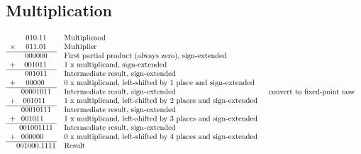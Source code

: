 \documentclass[12pt,openany]{book}
\begin{document}
			      	\subsection{Multiplication}
			      	 
			      	 
			      	\begin{align*}
			      		\begin{array}{r@{}c@{}l}
			      		       & 010.11                          & \text{\quad Multiplicand}                                                 \\
			      		\times & 011.01                          & \text{\quad Multiplier}                                                   \\ \cline{1-2}
			      		       & 000000                          & \text{\quad First partial product (always zero), sign-extended}           \\ 
			      		+      & \; \; \; \; 001011\phantom{.00} & \text{\quad 1 x multiplicand, sign-extended}                              \\ \cline{1-2}
			      		       & 001011                          & \text{\quad Intermediate result, sign-extended}                           \\ 
			      		+      & \phantom{0}00000\phantom{.0}    & \text{\quad 0 x multiplicand, left-shifted by 1 place and sign-extended}  \\ \cline{1-2}
			      		       & 00001011\phantom{}              & \text{\quad Intermediate result, sign-extended}                           \\ 
			      		+      & \phantom{00}001011\phantom{000} & \text{\quad 1 x multiplicand, left-shifted by 2 places and sign-extended} \\ \cline{1-2}
			      		       & 00010111                        & \text{\quad Intermediate result, sign-extended}                           \\ 
			      		+      & 001011\phantom{00}              & \text{\quad 1 x multiplicand, left-shifted by 3 places and sign-extended} \\ \cline{1-2}
			      		       & 001001111                       & \text{\quad Intermediate result, sign-extended}                           \\ 
			      		+      & 000000\phantom{00}              & \text{\quad 0 x multiplicand, left-shifted by 4 places and sign-extended} \\ \cline{1-2}
			      		       & 001000.1111                     & \text{\quad Result}                                                       \\
			      		\end{array} & \text{\quad convert to fixed-point now}
			      	\end{align*}
			      	
\end{document}
